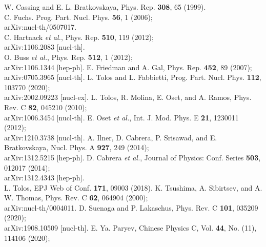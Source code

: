 \documentclass[12pt]{article}
\begin{document}
\begin{thebibliography}{99}
 W. Cassing and E. L. Bratkovskaya, Phys. Rep. {\bf 308}, 65 (1999).\\
                  C. Fuchs. Prog. Part. Nucl. Phys. {\bf 56}, 1 (2006);\\
                                  arXiv:nucl-th/0507017.\\                                                                              C. Hartnack {\it et al.}, Phys. Rep. {\bf 510}, 119 (2012);\\
                                    arXiv:1106.2083 [nucl-th].\\
                        O. Buss {\it et al.}, Phys. Rep. {\bf 512}, 1 (2012);\\
                                    arXiv:1106.1344 [hep-ph].
 E. Friedman and A. Gal, Phys. Rep. {\bf 452}, 89 (2007);\\
                                    arXiv:0705.3965 [nucl-th].
 L. Tolos and L. Fabbietti, Prog. Part. Nucl. Phys. {\bf 112}, 103770 (2020);\\
                            arXiv:2002.09223 [nucl-ex].
 L. Tolos, R. Molina, E. Oset, and A. Ramos, Phys. Rev. C {\bf 82}, 045210 (2010);\\
                                        arXiv:1006.3454 [nucl-th].
 E. Oset {\it et al.}, Int. J. Mod. Phys. E {\bf 21}, 1230011 (2012);\\
                                        arXiv:1210.3738 [nucl-th].
 A. Ilner, D. Cabrera, P. Srisawad, and E. Bratkovskaya, Nucl. Phys. A {\bf 927}, 249 (2014);\\
                                        arXiv:1312.5215 [hep-ph].
 D. Cabrera {\it et al.}, Journal of Physics: Conf. Series {\bf 503}, 012017 (2014);\\
                                        arXiv:1312.4343 [hep-ph].\\
             L. Tolos, EPJ Web of Conf. {\bf 171}, 09003 (2018).
 K. Tsushima, A. Sibirtsev, and A. W. Thomas, Phys. Rev. C {\bf 62}, 064904 (2000);\\
                                        arXiv:nucl-th/0004011.
 D. Suenaga and P. Lakaschus, Phys. Rev. C {\bf 101}, 035209 (2020);\\
                                        arXiv:1908.10509 [nucl-th].
 E. Ya. Paryev, Chinese Physics C, Vol. {\bf 44}, No. (11), 114106 (2020);\\

\end{thebibliography}
\end{document}
